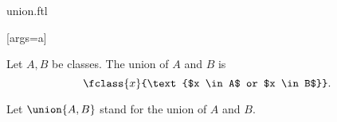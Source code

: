 \documentclass{article}
\begin{document}
\begin{smodule}[creators={Marcel Schütz}]{union.ftl}

  [args=a]{}

  \begin{fdefinition*}[label=2159753924968448]
    Let $A, B$ be classes.
    The union of $A$ and $B$ is
    \[\fclass{x}{\text{$x \in A$ or $x \in B$}}.\]

    Let $\union{A,B}$ stand for the union of $A$ and $B$.
  \end{fdefinition*}
\end{smodule}
\end{document}
